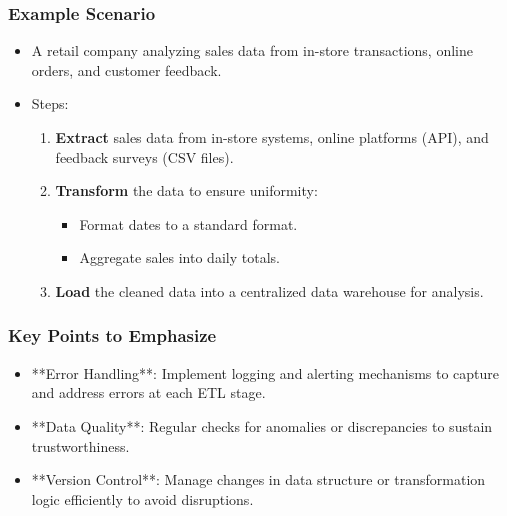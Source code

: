 \documentclass[aspectratio=169]{beamer}
\begin{document}
\begin{frame}[fragile]
    \frametitle{Example Scenario}
    \begin{itemize}
        \item A retail company analyzing sales data from in-store 
        transactions, online orders, and customer feedback.
        \item Steps:
        \begin{enumerate}
            \item \textbf{Extract} sales data from in-store systems, online 
            platforms (API), and feedback surveys (CSV files).
            \item \textbf{Transform} the data to ensure uniformity:
            \begin{itemize}
                \item Format dates to a standard format.
                \item Aggregate sales into daily totals.
            \end{itemize}
            \item \textbf{Load} the cleaned data into a centralized data 
            warehouse for analysis.
        \end{enumerate}
    \end{itemize}
\end{frame}

\begin{frame}[fragile]
    \frametitle{Key Points to Emphasize}
    \begin{itemize}
        \item **Error Handling**: Implement logging and alerting mechanisms to 
        capture and address errors at each ETL stage.
        \item **Data Quality**: Regular checks for anomalies or discrepancies 
        to sustain trustworthiness.
        \item **Version Control**: Manage changes in data structure or 
        transformation logic efficiently to avoid disruptions.
    \end{itemize}
\end{frame}
\end{document}
